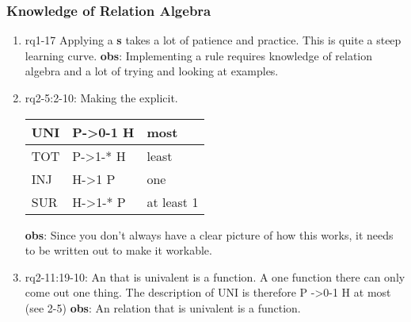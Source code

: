 \subsubsection{Knowledge of Relation Algebra}
\begin{comment}
plaats hier de afgehandelde items.
\end{comment}
\begin{enumerate}
    \item rq1-17 Applying a \textbf{s} takes a lot of patience and practice.
    This is quite a steep learning curve.
    \newline\textbf{obs}: Implementing a rule requires knowledge of relation algebra and a lot of trying and looking at examples.
     
    \item rq2-5:2-10: Making the  explicit.\newline
    \begin{tabular}{ || l | l | l ||}
    \hline
    UNI & P->0-1 H &  most\\  \hline    
    TOT & P->1-* H  & least\\  \hline
    INJ & H->1 P  &   one\\  \hline
    SUR & H->1-* P &  at least 1\\ \hline
    \end{tabular}
    \newline\textbf{obs}: Since you don't always have a clear picture of how this works, it needs to be written out to make it workable.
    
    \item rq2-11:19-10: An  that is univalent is a function.
    A one function there can only come out one thing.
    The description of UNI is therefore P ->0-1 H at most (see 2-5)
    \newline\textbf{obs}: An relation that is univalent is a function.
     
\end{enumerate}

